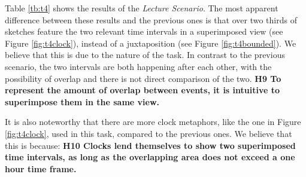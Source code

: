 Table \ref{tb:t4} shows the results of the \textit{Lecture Scenario}. The most apparent difference between these results and the previous ones is that over two thirds of sketches feature the two relevant time intervals in a superimposed view (see Figure \ref{fig:t4clock}), instead of a juxtaposition (see Figure \ref{fig:t4bounded}). We believe that this is due to the nature of the task. In contrast to the previous scenario, the two intervals are both happening after each other, with the possibility of overlap and there is not direct comparison of the two. \textbf{H9 To represent the amount of overlap between events, it is intuitive to superimpose them in the same view.}\par \medskip

It is also noteworthy that there are more clock metaphors, like the one in Figure \ref{fig:t4clock}, used in this task, compared to the previous ones. We believe that this is because: \textbf{H10 Clocks lend themselves to show two superimposed time intervals, as long as the overlapping area does not exceed a one hour time frame.} \par \medskip

